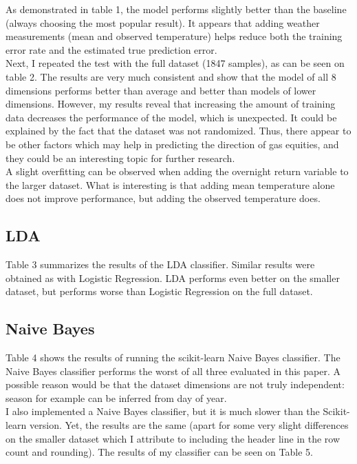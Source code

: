 \documentclass[conference,letterpaper]{IEEEtran}
\begin{document}
As demonstrated in table 1, the model performs slightly better than the baseline (always choosing the most popular result). It appears that adding weather measurements (mean and
observed temperature) helps reduce both the training error rate and the estimated true prediction error.\\
\indent Next, I repeated the test with the full dataset (1847 samples), as can be seen on table 2. The results are very much consistent and show that the model of all 8
dimensions performs better than average and better than models of lower dimensions. However, my results reveal that increasing the amount of training data decreases the
performance of the model, which is unexpected. It could be explained by the fact that the dataset was not randomized. Thus, there appear to be other factors which may
help in predicting the direction of gas equities, and they could be an interesting topic for further research. \\
\indent A slight overfitting can be observed when adding the overnight return variable to the larger dataset. What is interesting
is that adding mean temperature alone does not improve performance, but adding the observed temperature does. \\

\subsection{LDA}

Table 3 summarizes the results of the LDA classifier. Similar results were obtained as with Logistic Regression. LDA performs even better on the smaller dataset,
but performs worse than Logistic Regression on the full dataset. \\


\subsection{Naive Bayes}
Table 4 shows the results of running the scikit-learn Naive Bayes classifier. The Naive Bayes classifier performs the worst of all three evaluated in this paper. A possible reason
would be that the dataset dimensions are not truly independent: season for example can be inferred from day of year. \\
I also implemented a Naive Bayes classifier, but it is much slower than the Scikit-learn version. Yet, the results are the same
(apart for some very slight differences on the smaller dataset which I attribute to including the header line in the row count and rounding). The results of my classifier
can be seen on Table 5.
\end{document}
